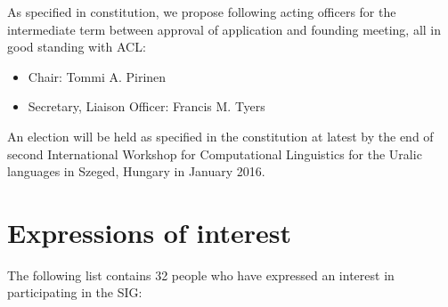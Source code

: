 \documentclass[11pt,a4paper]{article}
\begin{document}
As specified in constitution, we propose following acting officers for the intermediate term between approval of application and founding meeting, all in good standing with ACL:

\begin{itemize}
\item Chair: Tommi A. Pirinen
\item Secretary, Liaison Officer: Francis M. Tyers
\end{itemize}

An election will be held as specified in the constitution at latest by the end of second International Workshop for Computational Linguistics for the Uralic languages in Szeged, Hungary in January 2016.

\section*{Expressions of interest}

The following list contains 32 people who have expressed an interest in 
participating in the SIG:
\end{document}

